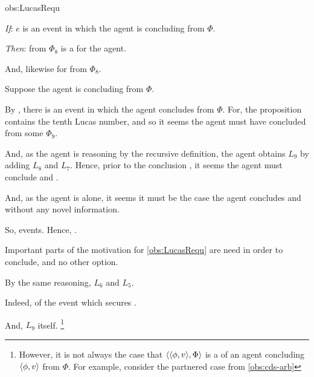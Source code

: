 \begin{note}
\begin{motivation}{obs:LucasRequ}
    \begin{itenum}
    \item[\emph{If}:]
      \(e\) is an event in which the agent is concluding\newline {} from \(\Phi\).
    \item[\emph{Then}:]
       from \(\Phi_{8}\) is a \fc{} for the agent.
    \end{itenum}
    And, likewise for  from \(\Phi_{8}\).

    Suppose the agent is concluding  from \(\Phi\).

    By \assuPP{}, there is an event in which the agent concludes\newline {} from \(\Phi\).
    For, the proposition contains the tenth Lucas number, and so it seems the agent must have concluded  from some \pool{} \(\Phi_{9}\).

    And, as the agent is reasoning by the recursive definition, the agent obtains \(L_{9}\) by adding \(L_{8}\) and \(L_{7}\).
    Hence, prior to the conclusion , it seems the agent must conclude  and .

    And, as the agent is alone, it seems it must be the case the agent concludes  and  without any novel information.

    So, events.
    Hence, .
  \end{motivation}

  Important parts of the motivation for \autoref{obs:LucasRequ} are need in order to conclude, and no other option.

  By the same reasoning, \(L_{6}\) and \(L_{5}\).

  Indeed,  of the event which secures \fc{}.

  And, \(L_{9}\) itself.%
  \footnote{
    However, it is not always the case that \(\langle \langle \phi, v \rangle, \Phi \rangle\) is a \requ{} of an agent concluding \(\langle \phi, v \rangle\) from \(\Phi\).
    For example, consider the partnered case from \autoref{obs:cds-arb}
  }
\end{note}

